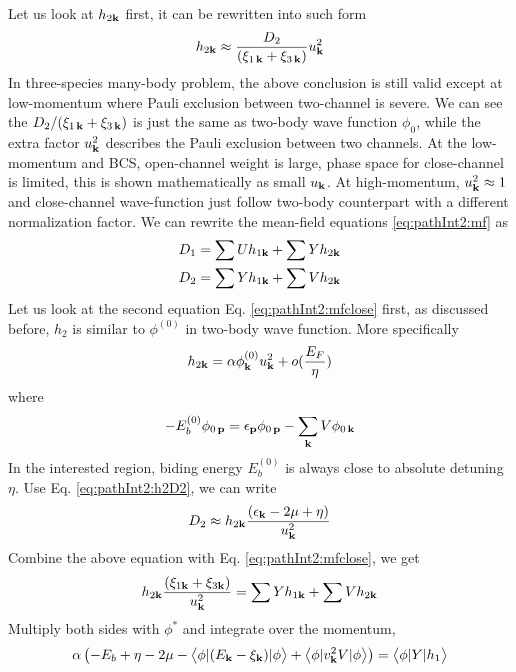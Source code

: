 Let us look at $h_{2\mathbf{k}}$ first, it can be rewritten into such form
\begin{equation}\label{eq:pathInt2:h2D2}
 h_{2\mathbf{k}}\approx\frac{D_{2}}{(\xi_{1\,\mathbf{k}}+\xi_{3\,\mathbf{k}})}u_{\mathbf{k}}^{2}
\end{equation}
In three-species many-body problem, the above conclusion is still valid except at low-momentum where Pauli exclusion between two-channel is severe. We can see the ${D_{2}}/{(\xi_{1\,\mathbf{k}}+\xi_{3\,\mathbf{k}})}$ is just the same as two-body wave function $\phi_{0}$, while the extra factor $u_{\mathbf{k}}^{2}$ describes the Pauli exclusion between two channels.  At the low-momentum and BCS, open-channel weight is large, phase space for close-channel is limited, this is shown mathematically as small $u_{\mathbf{k}}$.   At high-momentum, $u_{\mathbf{k}}^{2}\approx1$ and close-channel wave-function just follow two-body counterpart with a different normalization factor.  
We can rewrite the mean-field equations \ref{eq:pathInt2:mf} as 
\begin{align}
D_{1}&=\sum{}Uh_{1\mathbf{k}}+\sum{}Yh_{2\mathbf{k}}\label{eq:pathInt2:mfopen}\\
D_{2}&=\sum{}Yh_{1\mathbf{k}}+\sum{}Vh_{2\mathbf{k}}\label{eq:pathInt2:mfclose}
\end{align}
Let us look at the second equation Eq. \ref{eq:pathInt2:mfclose} first, as discussed before, $h_{2}$ is similar to $\phi^{(0)}$ in two-body wave function. More specifically
\begin{equation}
h_{2\mathbf{k}}=\alpha\phi^{(0)}_{\mathbf{k}}u_{\mathbf{k}}^{2}+o(\frac{E_{F}}{\eta})
\end{equation}
 where 
\begin{equation}\label{eq:pathInt2:phi}
-E_{b}^{(0)}\phi_{0\,\mathbf{p}}=\epsilon_{\mathbf{p}}\phi_{0\,\mathbf{p}}-\sum_{\mathbf{k}}V \phi_{0\,\mathbf{k}}
\end{equation}
In the interested region, biding energy $E_{b}^{(0)}$ is always close to absolute detuning $\eta$.   
Use Eq. \ref{eq:pathInt2:h2D2}, we can write 
\begin{equation*}
D_{2}\approx{}h_{2\mathbf{k}}\frac{(\epsilon_{\mathbf{k}}-2\mu+\eta)}{u_{\mathbf{k}}^{2}}
\end{equation*}
Combine the above equation with Eq. \ref{eq:pathInt2:mfclose}, we get 
\begin{equation*}
h_{2\mathbf{k}}\frac{(\xi_{1\mathbf{k}}+\xi_{3\mathbf{k}})}{u_{\mathbf{k}}^{2}}=\sum{}Yh_{1\mathbf{k}}+\sum{}Vh_{2\mathbf{k}}
\end{equation*}
Multiply both sides with $\phi^{*}$ and integrate over the momentum,
\begin{equation}
\alpha\left(-E_{b}+\eta-2\mu-\bigl<{\phi{\lvert{(E_{\ensuremath{\mathbf{k}}}-\xi_{\ensuremath{\mathbf{k}}})}\rvert}\phi}\bigr>+\bigl<{\phi{\lvert{v_{\ensuremath{\mathbf{k}}}^{2}V}\rvert}\phi}\bigr>\right)=\bigl<{\phi{\lvert{Y}\rvert}h_{1}}\bigr>
\end{equation}
